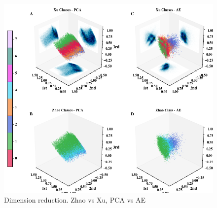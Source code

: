 \documentclass[utf8]{frontiersSCNS} %
\begin{document}
\begin{figure}[h!]
	\begin{center}
		\includegraphics[width=16cm]{Amaya/dimreduc}%
	\end{center}
	\caption{ Dimension reduction. Zhao vs Xu, PCA vs AE}\label{fig:dimreduc}
\end{figure}
\end{document}
